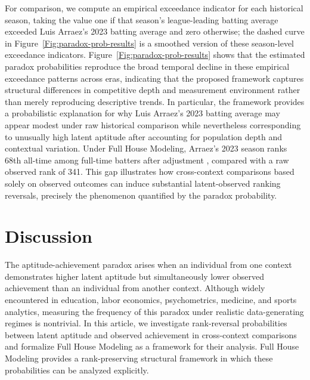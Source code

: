 \documentclass[12pt]{article}
\begin{document}
For comparison, we compute an empirical exceedance indicator for each historical season, taking the value one if that season's league-leading batting average exceeded Luis Arraez's 2023 batting average and zero otherwise; the dashed curve in Figure~\ref{Fig:paradox-prob-results} is a smoothed version of these season-level exceedance indicators. Figure~\ref{Fig:paradox-prob-results} shows that the estimated paradox probabilities reproduce the broad temporal decline in these empirical exceedance patterns across eras, indicating that the proposed framework captures structural differences in competitive depth and measurement environment rather than merely reproducing descriptive trends. In particular, the framework provides a probabilistic explanation for why Luis Arraez's 2023 batting average may appear modest under raw historical comparison while nevertheless corresponding to unusually high latent aptitude after accounting for population depth and contextual variation. Under Full House Modeling, Arraez's 2023 season ranks 68th all-time among full-time batters after adjustment \citep{yan2025comparing, fullhouse2025}, compared with a raw observed rank of 341. This gap illustrates how cross-context comparisons based solely on observed outcomes can induce substantial latent-observed ranking reversals, precisely the phenomenon quantified by the paradox probability.


\section{Discussion}

The aptitude-achievement paradox arises when an individual from one context demonstrates higher latent aptitude but simultaneously lower observed achievement than an individual from another context. Although widely encountered in education, labor economics, psychometrics, medicine, and sports analytics, measuring the frequency of this paradox under realistic data-generating regimes is nontrivial. In this article, we investigate rank-reversal probabilities between latent aptitude and observed achievement in cross-context comparisons and formalize Full House Modeling as a framework for their analysis. Full House Modeling provides a rank-preserving structural framework in which these probabilities can be analyzed explicitly.
\end{document}
